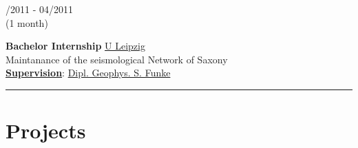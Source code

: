 \documentclass{article}
\newcommand{\spacingWork}{0.25cm}
\begin{document}
\begin{minipage}[t]{0.69\textwidth}
\begin{minipage}[t]{0.99\textwidth}
		\vspace{\spacingWork}
		
				\begin{minipage}[t]{0.2\textwidth}
				/2011 -  04/2011\\(1 month)
				\end{minipage}
				\hfill
				\begin{minipage}[t]{0.75\textwidth}
				\textbf{Bachelor Internship}\hfill
				\href{http://geologie.physgeo.uni-leipzig.de}{\color{pblue}U Leipzig}\\
				Maintanance of the seismological Network of Saxony\\
				\textbf{\underline{Supervision}}: \href{mailto:sfunke@rz.uni-leipzig.de}{\color{pblue}Dipl. Geophys. S. Funke}
			\end{minipage}		
	\end{minipage}
	\vspace{\spacingWork}
		\hrule
		
		\section*{\fontsize{18pt}{24pt}\selectfont \color{pblue} Projects}


\end{minipage}
\end{document}
